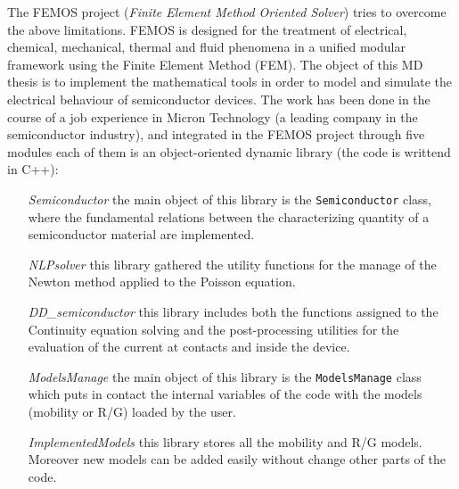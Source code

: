 The FEMOS project (\textit{Finite Element Method Oriented Solver}) tries to overcome the above limitations. FEMOS is designed for the treatment of electrical, chemical, mechanical, thermal and fluid phenomena in a unified modular framework using the Finite Element Method (FEM). 
The object of this MD thesis is to implement the mathematical tools in order to model and simulate the electrical behaviour of semiconductor devices. The work has been done in the course of a job experience in Micron Technology (a leading company in the semiconductor industry), and integrated in the FEMOS project through five modules each of them is an object-oriented dynamic library (the code is writtend in C++):

\begin{itemize}[leftmargin=3.7cm]
\item[\textit{Semiconductor}] the main object of this library is the \texttt{Semiconductor} class, where the fundamental relations between the characterizing quantity of a semiconductor material are implemented.  

\item[\textit{NLPsolver}] this library gathered the utility functions for the manage of the Newton method applied to the Poisson equation.

\item[\textit{DD\_semiconductor}] this library includes both the functions assigned to the Continuity equation solving and the post-processing utilities for the evaluation of the current at contacts and inside the device.

\item[\textit{ModelsManage}] the main object of this library is the \texttt{ModelsManage} class which puts in contact the internal variables of the code with the models (mobility or R/G) loaded by the user.

\item[\textit{ImplementedModels}] this library stores all the mobility and R/G models. Moreover new models can be added easily without change other parts of the code.
\end{itemize}


\vspace{1cm}

